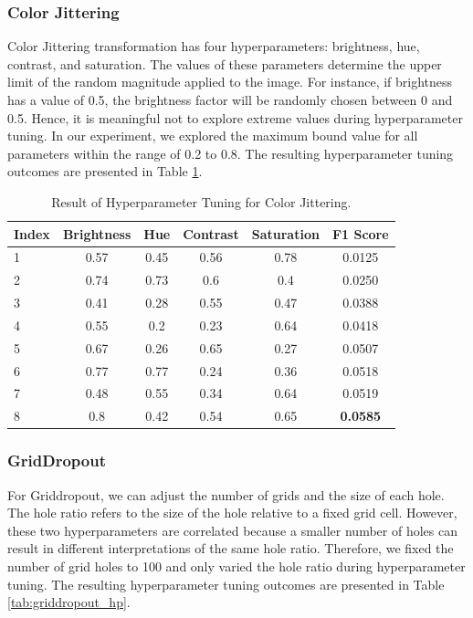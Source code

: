 \subsubsection{Color Jittering}
Color Jittering transformation has four hyperparameters: brightness, hue, contrast, and saturation. The values of these parameters determine the upper limit of the random magnitude applied to the image. For instance, if brightness has a value of 0.5, the brightness factor will be randomly chosen between 0 and 0.5. Hence, it is meaningful not to explore extreme values during hyperparameter tuning. In our experiment, we explored the maximum bound value for all parameters within the range of 0.2 to 0.8. The resulting hyperparameter tuning outcomes are presented in Table \ref{tab:colorjittering_hp}.

\begin{table}[ht]
\centering
\caption{Result of Hyperparameter Tuning for  Color Jittering.}
\begin{tabular}{lccccc}
\toprule
Index & Brightness & Hue & Contrast & Saturation & F1 Score \\
\midrule
1 & 0.57 & 0.45 & 0.56 & 0.78 & 0.0125 \\
2 & 0.74 & 0.73 & 0.6 & 0.4 & 0.0250 \\
3 & 0.41 & 0.28 & 0.55 & 0.47 & 0.0388 \\
4 & 0.55 & 0.2 & 0.23 & 0.64 & 0.0418 \\
5 & 0.67 & 0.26 & 0.65 & 0.27 & 0.0507 \\
6 & 0.77 & 0.77 & 0.24 & 0.36 & 0.0518 \\
7 & 0.48 & 0.55 & 0.34 & 0.64 & 0.0519 \\
8 & 0.8 & 0.42 & 0.54 & 0.65 & \textbf{0.0585} \\
\bottomrule
\end{tabular}
\label{tab:colorjittering_hp}
\end{table}

\subsubsection{GridDropout}
For Griddropout, we can adjust the number of grids and the size of each hole. The hole ratio refers to the size of the hole relative to a fixed grid cell. However, these two hyperparameters are correlated because a smaller number of holes can result in different interpretations of the same hole ratio. Therefore, we fixed the number of grid holes to 100 and only varied the hole ratio during hyperparameter tuning. The resulting hyperparameter tuning outcomes are presented in Table \ref{tab:griddropout_hp}.

